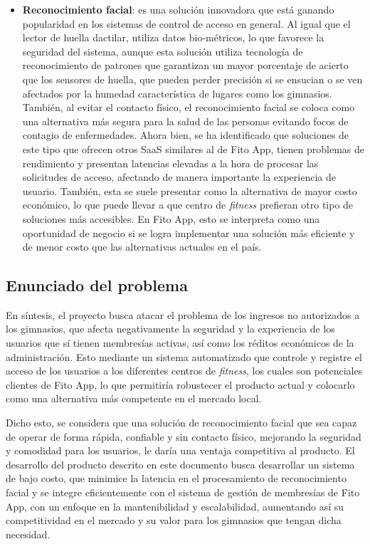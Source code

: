 \begin{itemize}
     \item \textbf{Reconocimiento facial}: es una solución innovadora que está ganando popularidad en los sistemas de control de acceso en general. Al igual que el lector de huella dactilar, utiliza datos bio-métricos, lo que favorece la seguridad del sistema, aunque esta solución utiliza tecnología de reconocimiento de patrones que garantizan un mayor porcentaje de acierto que los sensores de huella, que pueden perder precisión si se ensucian o se ven afectados por la humedad característica de lugares como los gimnasios. También, al evitar el contacto físico, el reconocimiento facial se coloca como una alternativa más segura para la salud de las personas evitando focos de contagio de enfermedades. Ahora bien, se ha identificado que soluciones de este tipo que ofrecen otros SaaS similares al de Fito App, tienen problemas de rendimiento y presentan latencias elevadas a la hora de procesar las solicitudes de acceso, afectando de manera importante la experiencia de usuario. También, esta se suele presentar como la alternativa de mayor costo económico, lo que puede llevar a que centro de \textit{fitness} prefieran otro tipo de soluciones más accesibles. En Fito App, esto se interpreta como una oportunidad de negocio si se logra implementar una solución más eficiente y de menor costo que las alternativas actuales en el país.

 \end{itemize}

 \subsection{Enunciado del problema}

En síntesis, el proyecto busca atacar el problema de los ingresos no autorizados a los gimnasios, que afecta negativamente la seguridad y la experiencia de los usuarios que sí tienen membresías activas, así como los réditos económicos de la administración. Esto mediante un sistema automatizado que controle y registre el acceso de los usuarios a los diferentes centros de \textit{fitness}, los cuales son potenciales clientes de Fito App, lo que permitiría robustecer el producto actual y colocarlo como una alternativa más competente en el mercado local. 

Dicho esto, se considera que una solución de reconocimiento facial que sea capaz de operar de forma rápida, confiable y sin contacto físico, mejorando la seguridad y comodidad para los usuarios, le daría una ventaja competitiva al producto. El desarrollo del producto descrito en este documento busca desarrollar un sistema de bajo costo, que minimice la latencia en el procesamiento de reconocimiento facial y se integre eficientemente con el sistema de gestión de membresías de Fito App, con un enfoque en la mantenibilidad y escalabilidad, aumentando así su competitividad en el mercado y su valor para los gimnasios que tengan dicha necesidad.

